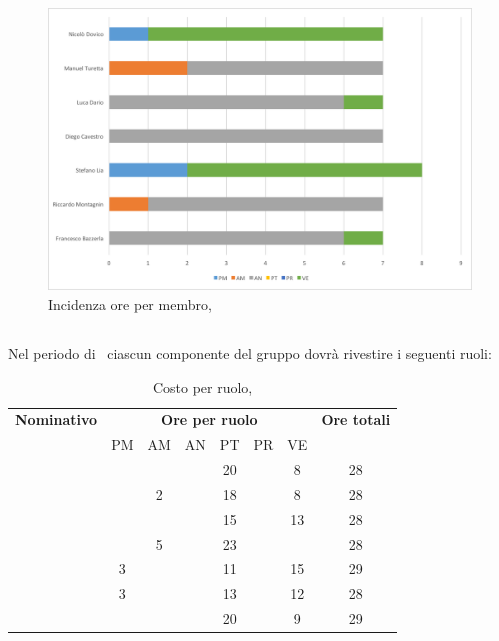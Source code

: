 \begin{figure}[H]
	\centering 
	\includegraphics[scale=0.7]{Immagini/GraficiPianoLavoro/ARD.png}
	\caption{Incidenza ore per membro, \ARD}
\end{figure}

\newpage
\subsection{\PA}
Nel periodo di \PA\ ciascun componente del gruppo dovrà rivestire i seguenti ruoli:

\begin{table}[h]
	\begin{center}
		\begin{tabular}{|c|c|c|c|c|c|c|c|}
			\hline
			\textbf{Nominativo} & \multicolumn{6}{c|}{\textbf{Ore per ruolo}} & \textbf{Ore totali} \\
					& PM & AM & AN & PT & PR & VE & \\
			\hline
			\FB		&	 &	  &	   & 20	&	 & 8  &	28	\\
			\hline
			\RM		&	 & 2  &	   & 18	&  	 & 8 & 28	\\
			\hline
			\SL		&	 &	  &	   & 15	&	 & 13 &	28	\\
			\hline
			\DC		&	 & 5  &	   & 23	&	 & 	  &	28	\\
			\hline
			\LD 	& 3	 &	  &	   & 11	&	 & 15 &	29	\\
			\hline
			\MT		& 3	 &	  &	   & 13	&	 & 12 &	28	\\
			\hline
			\ND 	&	 &	  &	   & 20	&	 & 9  & 29	\\
			\hline
		\end{tabular}
	\end{center}
	\caption{Costo per ruolo, \PA}
\end{table}

